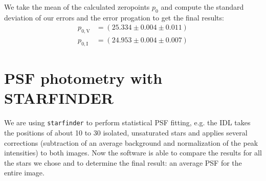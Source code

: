 	
We take the mean of the calculated zeropoints $p_0$ and compute the standard deviation of our errors and the error progation to get the final results: 
\begin{align*}
	p_{0,\text{V}} &= (25.334 \pm 0.004 \pm 0.011) \\
	p_{0,\text{I}} &= (24.953 \pm 0.004 \pm 0.007)
\end{align*}

\section{PSF photometry with STARFINDER}
We are using \texttt{starfinder} to perform statistical PSF fitting, e.g. the IDL takes the positions of about 10 to 30 isolated, unsaturated stars and applies several corrections (subtraction of an average background and normalization of the peak intensities) to both images. Now the software is able to compare the results for all the stars we chose and to determine the final result: an average PSF for the entire image.
